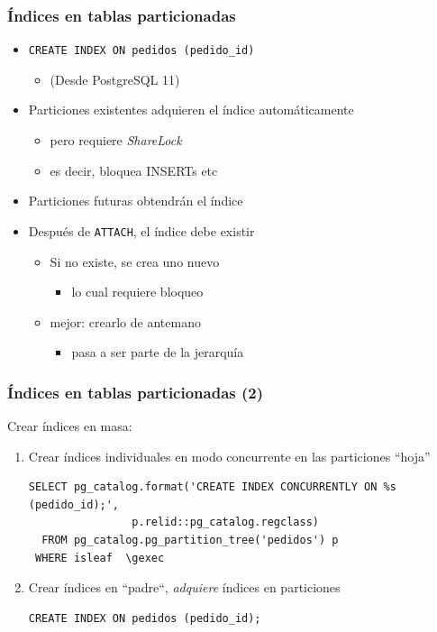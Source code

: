 \documentclass[ignorenonframetext,t]{beamer}
\begin{document}
\begin{frame}
    \frametitle{Índices en tablas particionadas}

	\begin{itemize}
		\item \texttt{CREATE INDEX ON pedidos (pedido\_id)}
		\begin{itemize} \item (Desde PostgreSQL 11) \end{itemize}
		\item Particiones existentes adquieren el índice automáticamente
			\begin{itemize}
				\item pero requiere \emph{ShareLock}
				\item es decir, bloquea INSERTs etc
			\end{itemize}
		\item Particiones futuras obtendrán el índice
			\pause
		\item Después de \texttt{ATTACH}, el índice debe existir
			\begin{itemize}
				\item Si no existe, se crea uno nuevo
				\begin{itemize} \item lo cual requiere bloqueo \end{itemize}
				\item mejor: crearlo de antemano
				\begin{itemize} \item pasa a ser parte de la jerarquía \end{itemize}
			\end{itemize}
	\end{itemize}
\end{frame}

\begin{frame}[fragile]
	\frametitle{Índices en tablas particionadas (2)}

	Crear índices en masa:

	\begin{enumerate}
		\item Crear índices individuales en modo concurrente en las particiones ``hoja''

\begin{lstlisting}
SELECT pg_catalog.format('CREATE INDEX CONCURRENTLY ON %s (pedido_id);',
                p.relid::pg_catalog.regclass)
  FROM pg_catalog.pg_partition_tree('pedidos') p
 WHERE isleaf  \gexec
\end{lstlisting}

\item Crear índices en ``padre``, \emph{adquiere} índices en particiones

	\begin{lstlisting}
CREATE INDEX ON pedidos (pedido_id);
\end{lstlisting}
	\end{enumerate}

\end{frame}
\end{document}
